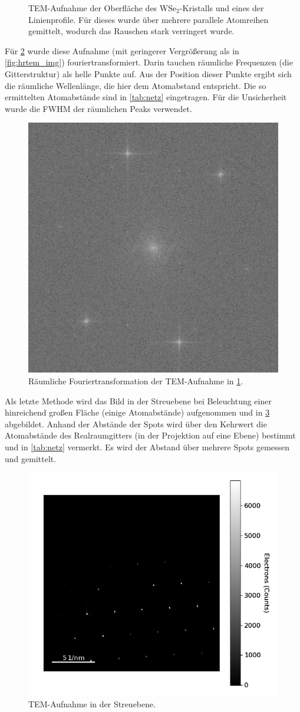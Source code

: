 \begin{figure}[H]
\begin{subfigure}[b]{0.45\textwidth}
				\caption{}
		\end{subfigure}
		\caption{
      TEM-Aufnahme der Oberfläche des WSe$_2$-Kristalls und eines der Linienprofile. Für dieses wurde über mehrere parallele Atomreihen gemittelt, wodurch das Rauschen stark verringert wurde.
				}
    \label{fig:hrtem}
	\end{figure}

  Für \cref{fig:ft} wurde diese Aufnahme (mit geringerer Vergrößerung als in \cref{fig:hrtem_img}) fouriertransformiert.
  Darin tauchen räumliche Frequenzen (die Gitterstruktur) als helle Punkte auf.
  Aus der Position dieser Punkte ergibt sich die räumliche Wellenlänge, die hier dem Atomabstand entspricht.
  Die so ermittelten Atomabstände sind in \cref{tab:netz} eingetragen.
  Für die Unsicherheit wurde die FWHM der räumlichen Peaks verwendet.

	\begin{figure}[H]
  \centering
			\includegraphics[width= 0.4 \linewidth]{img/tem_hrtem_crop_fft}
			\caption{
        Räumliche Fouriertransformation der TEM-Aufnahme in \cref{fig:hrtem}.
			}
			\label{fig:ft}
	\end{figure}

  Als letzte Methode wird das Bild in der Streuebene bei Beleuchtung einer hinreichend großen Fläche (einige Atomabstände) aufgenommen und in \cref{fig:diff} abgebildet.
  Anhand der Abstände der Spots wird über den Kehrwert die Atomabstände des Realraumgitters (in der Projektion auf eine Ebene) bestimmt und in \cref{tab:netz} vermerkt.
  Es wird der Abstand über mehrere Spots gemessen und gemittelt.

	\begin{figure}[H]
  \centering
			\includegraphics[width= 0.6 \linewidth]{img/tem_diff}
			\caption{
        TEM-Aufnahme in der Streuebene.
			}
			\label{fig:diff}
	\end{figure}



